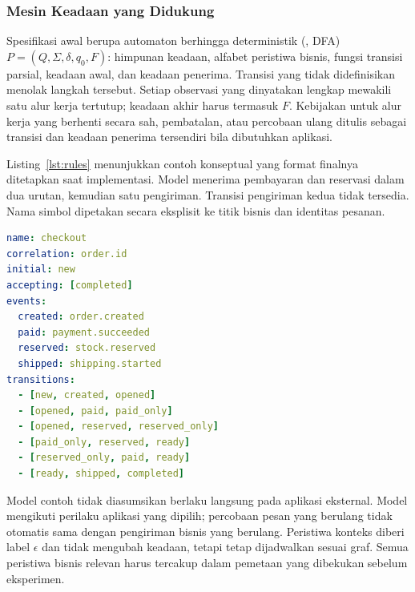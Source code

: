 \subsubsection{Mesin Keadaan yang Didukung}
Spesifikasi awal berupa automaton berhingga deterministik (, DFA) $P=(Q,\Sigma,\delta,q_0,F)$: himpunan keadaan, alfabet peristiwa bisnis, fungsi transisi parsial, keadaan awal, dan keadaan penerima. Transisi yang tidak didefinisikan menolak langkah tersebut. Setiap observasi yang dinyatakan lengkap mewakili satu alur kerja tertutup; keadaan akhir harus termasuk $F$. Kebijakan untuk alur kerja yang berhenti secara sah, pembatalan, atau percobaan ulang ditulis sebagai transisi dan keadaan penerima tersendiri bila dibutuhkan aplikasi.

Listing~\ref{lst:rules} menunjukkan contoh konseptual yang format finalnya ditetapkan saat implementasi. Model menerima pembayaran dan reservasi dalam dua urutan, kemudian satu pengiriman. Transisi pengiriman kedua tidak tersedia. Nama simbol dipetakan secara eksplisit ke titik bisnis dan identitas pesanan.
\begin{lstlisting}[language=yaml,caption={Contoh mesin keadaan alur pemesanan},label={lst:rules}]
name: checkout
correlation: order.id
initial: new
accepting: [completed]
events:
  created: order.created
  paid: payment.succeeded
  reserved: stock.reserved
  shipped: shipping.started
transitions:
  - [new, created, opened]
  - [opened, paid, paid_only]
  - [opened, reserved, reserved_only]
  - [paid_only, reserved, ready]
  - [reserved_only, paid, ready]
  - [ready, shipped, completed]
\end{lstlisting}

Model contoh tidak diasumsikan berlaku langsung pada aplikasi eksternal. Model mengikuti perilaku aplikasi yang dipilih; percobaan pesan yang berulang tidak otomatis sama dengan pengiriman bisnis yang berulang. Peristiwa konteks diberi label $\epsilon$ dan tidak mengubah keadaan, tetapi tetap dijadwalkan sesuai graf. Semua peristiwa bisnis relevan harus tercakup dalam pemetaan yang dibekukan sebelum eksperimen.

